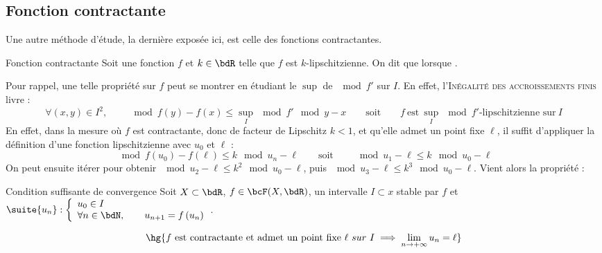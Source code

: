 \documentclass[a4paper,french,bookmarks]{article}
\begin{document}
\subsection{Fonction contractante}

Une autre méthode d'étude, la dernière exposée ici, est celle des fonctions contractantes.

\begin{definition}{Fonction contractante}{}
    Soit une fonction $f$ et $k \in \bdR$ telle que $f$ est $k$-lipschitzienne. On dit que  lorsque .
\end{definition}

Pour rappel, une telle propriété sur $f$ peut se montrer en étudiant le $\sup$ de $\mod{f'}$ sur $I$. En effet, l'\textsc{Inégalité des accroissements finis} livre :
%
\[ \forall (x, y) \in I^2, \qquad \mod{f(y) - f(x)} \leq \sup\limits_{I}\mod{f'}\mod{y-x} \qquad\text{soit}\qquad f \ \text{est} \ \sup\limits_{I}\mod{f'}\text{-lipschitzienne sur} \ I\]
%
En effet, dans la mesure où $f$ est contractante, donc de facteur de Lipschitz $k < 1$, et qu'elle admet un point fixe $\ell$, il suffit d'appliquer la définition d'une fonction lipschitzienne avec $u_0$ et $\ell$ :
%
\[ \mod{f\left(u_0\right) - f(\ell)} \leq k \mod{u_n - \ell} \qquad\text{soit}\qquad \mod{u_1 - \ell} \leq k \mod{u_0 - \ell}\]
%
On peut ensuite itérer pour obtenir $\mod{u_2 - \ell} \leq k^2\mod{u_0 - \ell}$, puis $\mod{u_3 - \ell} \leq k^3\mod{u_0 - \ell}$. Vient alors la propriété :

\begin{property}{Condition suffisante de convergence}{}
    Soit $X \subset \bdR$, $f \in \bcF(X, \bdR)$, un intervalle $I \subset x$ stable par $f$ et $\suite{u_n} : \left\lbrace\begin{array}{l}
        u_0 \in I  \\
        \forall n \in \bdN,\qquad u_{n+1} = f\left(u_n\right) 
    \end{array}\right.$.
    
    \[ \hg{f \ \text{est contractante et admet un point fixe} \ \ell \ {sur} \ I \implies \lim\limits_{n \to +\infty} u_n = \ell}\]
\end{property}
\end{document}
